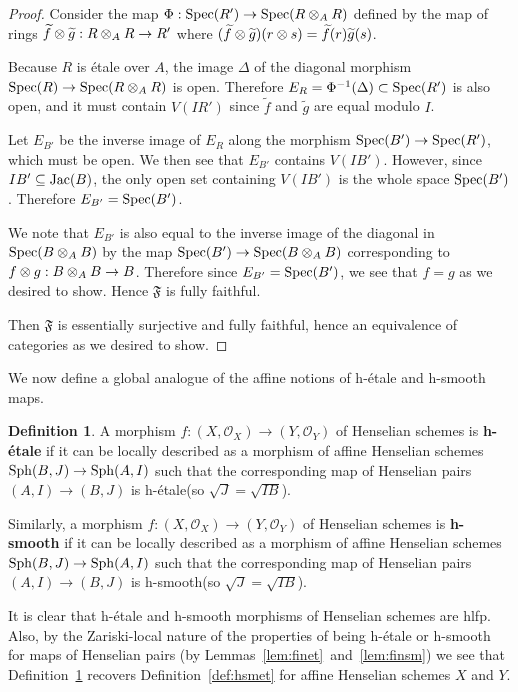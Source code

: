 \documentclass[12pt]{article}
\renewcommand{\O}{\mathscr{O}}
\newcommand{\spec}{{\rm Spec}}
\newcommand{\Jac}{{\rm Jac}}
\newcommand{\sph}{{\rm Sph}}
\newcommand{\mf}[1]{\mathfrak{#1}}
\newcommand{\Et}{\'etale\xspace}
\newcommand{\hlfp}{hlfp\xspace}
\newcommand{\hetale}{h-\'etale\xspace}
\newcommand{\hsmooth}{h-smooth\xspace}
\theoremstyle{definition}
\newtheorem{definition}[theorem]{Definition}
\numberwithin{equation}{subsection}
\begin{document}
\begin{proof}
Consider the map $\Phi: \spec(R') \to \spec(R \tens_A R)$ defined by the map of rings $\widetilde{f} \tens \widetilde{g}: R \tens_A R \to R'$ where $(\widetilde{f} \tens \widetilde{g})(r \tens s) = \widetilde{f}(r)\widetilde{g}(s)$. 

Because $R$ is \Et over $A$, the image $\Delta$ of the diagonal morphism $\spec(R) \to \spec(R \tens_A R)$ is open. Therefore $E_R=\Phi^{-1}(\Delta) \subset \spec(R')$ is also open, and it must contain $V(IR')$ since $\widetilde{f}$ and $\widetilde{g}$ are equal modulo $I$. 

Let $E_{B'}$ be the inverse image of $E_R$ along the morphism $\spec(B') \to \spec(R')$, which must be open. We then see that $E_{B'}$ contains $V(IB')$. However, since $IB'\subseteq \Jac(B)$, the only open set containing $V(IB')$ is the whole space $\spec(B')$. Therefore $E_{B'}=\spec(B')$.

We note that $E_{B'}$ is also equal to the inverse image of the diagonal in $\spec(B \tens_A B)$ by the map $\spec(B') \to \spec(B \tens_A B)$ corresponding to $f \tens g: B \tens_A B \to B$. Therefore since $E_{B'}=\spec(B')$, we see that $f=g$ as we desired to show. Hence $\mf{F}$ is fully faithful.


Then $\mf{F}$ is essentially surjective and fully faithful, hence an equivalence of categories as we desired to show. \end{proof}

We now define a global analogue of the affine notions of \hetale and \hsmooth maps.

\begin{definition}\label{def:hsmetglob} A morphism $f: (X,\O_X) \to (Y,\O_Y)$ of Henselian schemes is {\bf \hetale} if it can be locally described as a morphism of affine Henselian schemes $\sph(B,J) \to \sph(A,I)$ such that the corresponding map of Henselian pairs $(A,I) \to (B,J)$ is \hetale (so $\sqrt{J}=\sqrt{IB}$). 

Similarly, a morphism $f: (X,\O_X) \to (Y,\O_Y)$ of Henselian schemes is {\bf \hsmooth} if it can be locally described as a morphism of affine Henselian schemes $\sph(B,J) \to \sph(A,I)$ such that the corresponding map of Henselian pairs $(A,I) \to (B,J)$ is \hsmooth (so $\sqrt{J}=\sqrt{IB}$). 
\end{definition}

It is clear that \hetale and \hsmooth morphisms of Henselian schemes are \hlfp. Also, by the Zariski-local nature of the properties of being \hetale or \hsmooth for maps of Henselian pairs (by Lemmas~\ref{lem:finet}~and~\ref{lem:finsm}) we see that Definition~\ref{def:hsmetglob} recovers Definition~\ref{def:hsmet} for affine Henselian schemes $X$ and $Y$.
\end{document}
